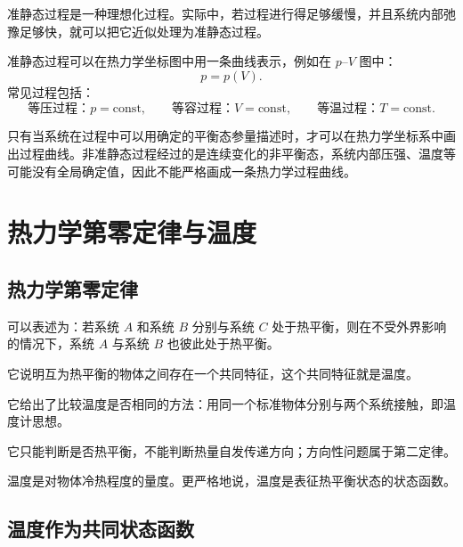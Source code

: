 准静态过程是一种理想化过程。实际中，若过程进行得足够缓慢，并且系统内部弛豫足够快，就可以把它近似处理为准静态过程。

\begin{FormulaBox}[准静态过程与热力学坐标图]
准静态过程可以在热力学坐标图中用一条曲线表示，例如在 \(p\)--\(V\) 图中：
\[
  p=p(V).
\]
常见过程包括：
\[
  \text{等压过程：}p=\mathrm{const},\qquad
  \text{等容过程：}V=\mathrm{const},\qquad
  \text{等温过程：}T=\mathrm{const}.
\]
\end{FormulaBox}

\begin{WarnBox}
只有当系统在过程中可以用确定的平衡态参量描述时，才可以在热力学坐标系中画出过程曲线。非准静态过程经过的是连续变化的非平衡态，系统内部压强、温度等可能没有全局确定值，因此不能严格画成一条热力学过程曲线。
\end{WarnBox}

\section{热力学第零定律与温度}

\subsection{热力学第零定律}

可以表述为：若系统 \(A\) 和系统 \(B\) 分别与系统 \(C\) 处于热平衡，则在不受外界影响的情况下，系统 \(A\) 与系统 \(B\) 也彼此处于热平衡。

\begin{KeyBox}[第零定律的核心意义]
\begin{ReviewList}
  \item 它说明互为热平衡的物体之间存在一个共同特征，这个共同特征就是温度。
  \item 它给出了比较温度是否相同的方法：用同一个标准物体分别与两个系统接触，即温度计思想。
  \item 它只能判断是否热平衡，不能判断热量自发传递方向；方向性问题属于第二定律。
\end{ReviewList}
\end{KeyBox}

温度是对物体冷热程度的量度。更严格地说，温度是表征热平衡状态的状态函数。

\subsection{温度作为共同状态函数}

